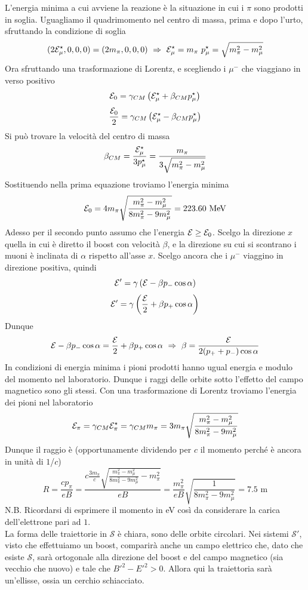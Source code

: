 \documentclass[12pt,twoside,a4]{article}
\begin{document}
\begin{solution}
L'energia minima a cui avviene la reazione è la situazione in cui i $\pi$ sono prodotti in soglia. Uguagliamo il quadrimomento nel centro di massa, prima e dopo l'urto, sfruttando la condizione di soglia
$$ (2 \mathcal{E}^\star_\mu,0,0,0) = (2 m_\pi,0,0,0 )  \  \Rightarrow  \  \mathcal{E}^\star_\mu = m_\pi  \  p_\mu^\star = \sqrt{m^2_\pi - m^2_\mu} $$
Ora sfruttando una trasformazione di Lorentz, e scegliendo i $\mu^-$ che viaggiano in verso positivo
$$ \mathcal{E}_0 = \gamma_{CM} \left({\mathcal{E}^\star_\mu +\beta_{CM} p^\star_\mu}\right) $$
$$ \frac{\mathcal{E}_0}{2} = \gamma_{CM} \left({\mathcal{E}^\star_\mu - \beta_{CM} p^\star_\mu}\right) $$
Si può trovare la velocità  del centro di massa
$$\beta_{CM} =  \frac{\mathcal{E}^\star_\mu}{3 p^\star_\mu} =  \frac{m_\pi}{3 \sqrt{m^2_\pi - m^2_\mu}}$$
Sostituendo nella prima equazione troviamo l'energia minima
$$\mathcal{E}_0 = 4 m_\pi \sqrt{\frac{m^2_\pi - m^2_\mu}{8 m^2_\pi - 9m^2_\mu}}= 223.60 \mbox{ MeV}$$
Adesso per il secondo punto assumo che l'energia $\mathcal{E} \geq \mathcal{E}_0$. Scelgo la direzione $x$ quella in cui è diretto il boost con velocità  $\beta$, e la direzione su cui si scontrano i muoni è inclinata di $\alpha$ rispetto all'asse $x$. Scelgo ancora che i $\mu^-$ viaggino in direzione positiva, quindi
$$ \mathcal{E}' = \gamma \left({\mathcal{E} - \beta p_- \cos \alpha}\right) $$
$$ \mathcal{E}' = \gamma \left({\frac{\mathcal{E}}{2} + \beta p_+ \cos \alpha}\right) $$
Dunque
$$ \mathcal{E} - \beta p_- \cos \alpha = \frac{\mathcal{E}}{2} + \beta p_+ \cos \alpha  \  \Rightarrow  \  \beta = \frac{\mathcal{E}}{2 (p_+ + p_- ) \cos \alpha} $$
In condizioni di energia minima i pioni prodotti hanno ugual energia e modulo del momento nel laboratorio. Dunque i raggi delle orbite sotto l'effetto del campo magnetico sono gli stessi. Con una trasformazione di Lorentz troviamo l'energia dei pioni nel laboratorio
$$ \mathcal{E}_\pi = \gamma_{CM} \mathcal{E}^\star_\pi = \gamma_{CM} m_\pi = 3 m_\pi \sqrt{\frac{m_\pi^2 - m_\mu^2}{8 m_\pi^2 - 9 m_\mu^2}}$$
Dunque il raggio è (opportunamente dividendo per $c$ il momento perché è ancora in unità  di $1$/$c$) 
$$ R = \frac{c p_\pi}{e B} = \frac{c \frac{3 m_\pi}{c} \sqrt{\frac{m_\pi^2 - m_\mu^2}{8 m_\pi^2 - 9 m_\mu^2} - m_\pi^2}}{e B} = \frac{m_\pi^2}{eB} \sqrt{\frac{1}{8m^2_\pi -9 m^2_\mu} } = 7.5 \mbox{ m}$$
N.B. Ricordarsi di esprimere il momento in eV così da considerare la carica dell'elettrone pari ad $1$.
\\
La forma delle traiettorie in $\mathcal{S}$ è chiara, sono delle orbite circolari. Nei sistemi $\mathcal{S}'$, visto che effettuiamo un boost, comparirà  anche un campo elettrico che, dato che esiste $\mathcal{S}$, sarà  ortogonale alla direzione del boost e del campo magnetico (sia vecchio che nuovo) e tale che $B'^2 - E'^2 > 0$. Allora qui la traiettoria sarà  un'ellisse, ossia un cerchio schiacciato.
\end{solution}
\end{document}
